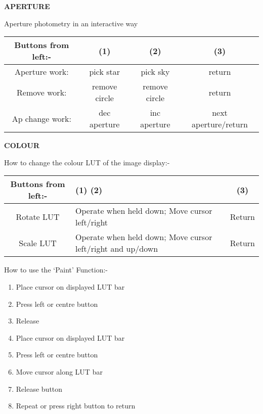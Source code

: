 {{                                                                               
{\bf \hspace*{4ex}      APERTURE }
                                                                               
       Aperture photometry in an interactive way
                                                                               
\hspace*{4ex}\begin{tabular}{|c|c|c|c|} \hline
      Buttons from left:- &   (1)    &       (2)   & (3) \\ \hline
        Aperture work:  & pick star    &   pick sky  &    return \\
          Remove work: & remove circle &   remove circle & return \\
       Ap change work:  & dec aperture  &  inc aperture  & next aperture/return \\ \hline
\end{tabular}
                                                                               
{\bf \hspace*{4ex}      COLOUR }
                                                                               
How to change the colour LUT of the image display:-
                                                                               
\hspace*{4ex}\begin{tabular}{|c|p{3.5in}|c|} \hline
      Buttons from left:- &   (1)   \hspace*{4ex} (2)   & (3) \\ \hline
       Rotate LUT      &Operate when held down; Move cursor left/right &       
Return \\ \hline
       Scale  LUT  &        Operate when held down;  Move cursor left/right and up/down &    
       Return \\ \hline
\end{tabular}

How to use the `Paint' Function:-

\begin{enumerate}
  \item              Place cursor on displayed LUT bar
  \item                Press left or centre button
  \item                Release
  \item                Place cursor on displayed LUT bar
  \item                Press left or centre button
  \item                Move cursor along LUT bar
  \item                Release button
  \item                Repeat or press right button to return
\end{enumerate}
                                                                        
}}
